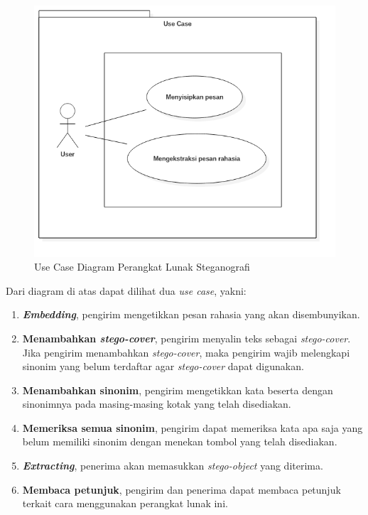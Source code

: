 \begin{figure}[H]
	\centering
	\includegraphics[scale=0.5]{Gambar/usecase}
	\caption{Use Case Diagram Perangkat Lunak Steganografi} 
	\label{fig:3_usecase}
\end{figure}

Dari diagram di atas dapat dilihat dua \textit{use case}, yakni:
\begin{enumerate}
	\item \textbf{\textit{Embedding}}, pengirim mengetikkan pesan rahasia yang akan disembunyikan.
	\item \textbf{Menambahkan \textit{stego-cover}}, pengirim menyalin teks sebagai \textit{stego-cover}. Jika pengirim menambahkan \textit{stego-cover}, maka pengirim wajib melengkapi sinonim yang belum terdaftar agar \textit{stego-cover} dapat digunakan.
	\item \textbf{Menambahkan sinonim}, pengirim mengetikkan kata beserta dengan sinonimnya pada masing-masing kotak yang telah disediakan.
	\item \textbf{Memeriksa semua sinonim}, pengirim dapat memeriksa kata apa saja yang belum memiliki sinonim dengan menekan tombol yang telah disediakan.
	\item \textbf{\textit{Extracting}}, penerima akan memasukkan \textit{stego-object} yang diterima.
	\item \textbf{Membaca petunjuk}, pengirim dan penerima dapat membaca petunjuk terkait cara menggunakan perangkat lunak ini.
\end{enumerate}

